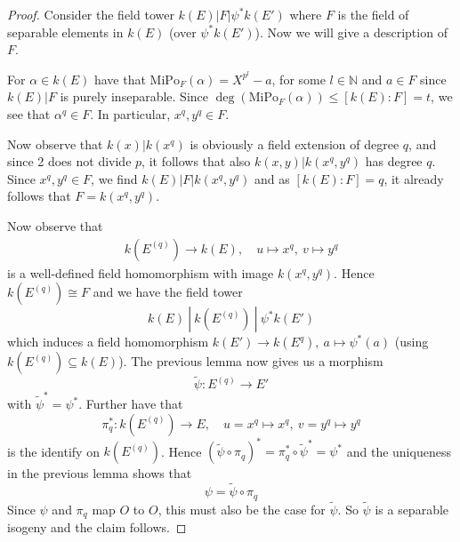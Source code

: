 \documentclass{scrartcl}
\newcommand{\N}{\mathbb{N}}
\renewcommand{\O}{O}
\theoremstyle{definition}
\begin{document}
\begin{proof}
    Consider the field tower $k(E) | F | \psi^*k(E')$ where $F$ is the field of separable elements in $k(E)$ (over $\psi^*k(E')$).
    Now we will give a description of $F$.

    For $\alpha \in k(E)$ have that $\mathrm{MiPo}_F(\alpha) = X^{p^l} -  a$, for some $l \in \N$ and $a \in F$ since $k(E) | F$ is purely inseparable.
    Since $\deg(\mathrm{MiPo}_F(\alpha)) \leq [k(E) : F] = t$, we see that $\alpha^q \in F$.
    In particular, $x^q, y^q \in F$.

    Now observe that $k(x) | k(x^q)$ is obviously a field extension of degree $q$, and since 2 does not divide $p$, it follows that also $k(x, y) | k(x^q, y^q)$ has degree $q$.
    Since $x^q, y^q \in F$, we find $k(E) | F | k(x^q, y^q)$ and as $[k(E) : F] = q$, it already follows that $F = k(x^q, y^q)$.

    Now observe that
    \begin{align*}
        k(E^{(q)}) \to k(E), \quad u \mapsto x^q, \ v \mapsto y^q
    \end{align*}
    is a well-defined field homomorphism with image $k(x^q, y^q)$.
    Hence $k(E^{(q)}) \cong F$ and we have the field tower
    \begin{equation*}
        k(E) \ | \ k(E^{(q)}) \ | \ \psi^*k(E')
    \end{equation*}
    which induces a field homomorphism $k(E') \to k(E^{q}), \ a \mapsto \psi^*(a)$ (using $k(E^{(q)}) \subseteq k(E)$).
    The previous lemma now gives us a morphism
    \begin{equation*}
        \tilde{\psi}: E^{(q)} \to E'
    \end{equation*}
    with $\tilde{\psi}^* = \psi^*$.
    Further have that
    \begin{equation*}
        \pi_q^*: k(E^{(q)}) \to E, \quad u = x^q \mapsto x^q, \ v = y^q \mapsto y^q
    \end{equation*}
    is the identify on $k(E^{(q)})$.
    Hence $(\tilde{\psi} \circ \pi_q)^* = \pi_q^* \circ \tilde{\psi}^* = \psi^*$ and the uniqueness in the previous lemma shows that
    \begin{equation*}
        \psi = \tilde{\psi} \circ \pi_q
    \end{equation*}
    Since $\psi$ and $\pi_q$ map $\O$ to $\O$, this must also be the case for $\tilde{\psi}$.
    So $\tilde{\psi}$ is a separable isogeny and the claim follows.
\end{proof}
\end{document}
